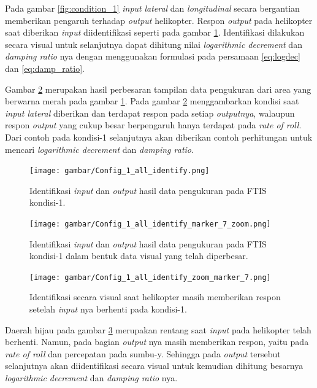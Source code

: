 Pada gambar \ref{fig:condition_1} \textit{input} \textit{lateral} dan \textit{longitudinal} secara bergantian memberikan pengaruh terhadap \textit{output} helikopter. Respon \textit{output} pada helikopter saat diberikan \textit{input} diidentifikasi seperti pada gambar \ref{fig:condition_1_identify}. Identifikasi dilakukan secara visual untuk selanjutnya dapat dihitung nilai \textit{logarithmic decrement} dan \textit{damping ratio} nya dengan menggunakan formulasi pada persamaan \ref{eq:logdec} dan \ref{eq:damp_ratio}.

Gambar \ref{fig:condition_1_identify_zoom} merupakan hasil perbesaran tampilan data pengukuran dari area yang berwarna merah pada gambar \ref{fig:condition_1_identify}. Pada gambar \ref{fig:condition_1_identify_zoom} menggambarkan kondisi saat \textit{input lateral} diberikan dan terdapat respon pada setiap \textit{outputnya}, walaupun respon \textit{output} yang cukup besar berpengaruh hanya terdapat pada \textit{rate of roll}. Dari contoh pada kondisi-1 selanjutnya akan diberikan contoh perhitungan untuk mencari \textit{logarithmic decrement} dan \textit{damping ratio}.

\begin{figure}[H]
	\centering
	\texttt{[image: gambar/Config\_1\_all\_identify.png]}
	\caption{Identifikasi \textit{input} dan \textit{output} hasil data pengukuran pada FTIS kondisi-1.}
	\label{fig:condition_1_identify}
\end{figure}

\begin{figure}[H]
	\centering
	\texttt{[image: gambar/Config\_1\_all\_identify\_marker\_7\_zoom.png]}
	\caption{Identifikasi \textit{input} dan \textit{output} hasil data pengukuran pada FTIS kondisi-1 dalam bentuk data visual yang telah diperbesar.}
	\label{fig:condition_1_identify_zoom}
\end{figure}

\begin{figure}[H]
	\centering
	\texttt{[image: gambar/Config\_1\_all\_identify\_zoom\_marker\_7.png]}
	\caption{Identifikasi secara visual saat helikopter masih memberikan respon setelah \textit{input} nya berhenti pada kondisi-1.}
	\label{fig:condition_1_identify_calc}
\end{figure}

Daerah hijau pada gambar \ref{fig:condition_1_identify_calc} merupakan rentang saat \textit{input} pada helikopter telah berhenti. Namun, pada bagian \textit{output} nya masih memberikan respon, yaitu pada \textit{rate of roll} dan percepatan pada sumbu-y. Sehingga pada \textit{output} tersebut selanjutnya akan diidentifikasi secara visual untuk kemudian dihitung besarnya \textit{logarithmic decrement} dan \textit{damping ratio} nya.

